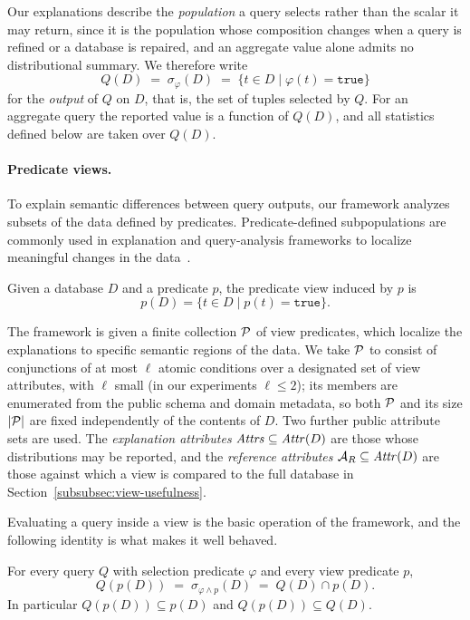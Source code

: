 Our explanations describe the \emph{population} a query selects rather than the
scalar it may return, since it is the population whose composition changes when a
query is refined or a database is repaired, and an aggregate value alone admits no
distributional summary.
We therefore write
\[
Q(D) \;=\; \sigma_{\varphi}(D) \;=\; \{t \in D \mid \varphi(t)=\texttt{true}\}
\]
for the \emph{output} of $Q$ on $D$, that is, the set of tuples selected by $Q$.
For an aggregate query the reported value is a function of $Q(D)$, and all
statistics defined below are taken over $Q(D)$.

\paragraph{Predicate views.}
To explain semantic differences between query outputs, our framework analyzes
subsets of the data defined by predicates.
Predicate-defined subpopulations are commonly used in explanation and
query-analysis frameworks to localize meaningful changes in the
data~\cite{FEDEX,TaoGMR22,wu2013}.

\begin{definition}
\label{def:predicate-view}
Given a database $D$ and a predicate $p$, the predicate view induced by $p$ is
\[
p(D)=\{t\in D \mid p(t)=\texttt{true}\}.
\]
\end{definition}

The framework is given a finite collection $\mathcal{P}$ of view predicates, which
localize the explanations to specific semantic regions of the data.
We take $\mathcal{P}$ to consist of conjunctions of at most $\ell$ atomic conditions over
a designated set of view attributes, with $\ell$ small (in our experiments
$\ell\le 2$); its members are enumerated from the public schema and domain
metadata, so both $\mathcal{P}$ and its size $|\mathcal{P}|$ are fixed independently of the
contents of $D$.
Two further public attribute sets are used.
The \emph{explanation attributes} $\mathit{Attrs}\subseteq\mathit{Attr}(D)$ are those whose
distributions may be reported, and the \emph{reference attributes}
$\mathcal{A}_R\subseteq\mathit{Attr}(D)$ are those against which a view is compared to the
full database in Section~\ref{subsubsec:view-usefulness}.

Evaluating a query inside a view is the basic operation of the framework, and the
following identity is what makes it well behaved.

\begin{proposition}
\label{prop:view-restriction}
For every query $Q$ with selection predicate $\varphi$ and every view predicate $p$,
\[
Q(p(D)) \;=\; \sigma_{\varphi\wedge p}(D) \;=\; Q(D)\cap p(D).
\]
In particular $Q(p(D)) \subseteq p(D)$ and $Q(p(D)) \subseteq Q(D)$.
\end{proposition}

